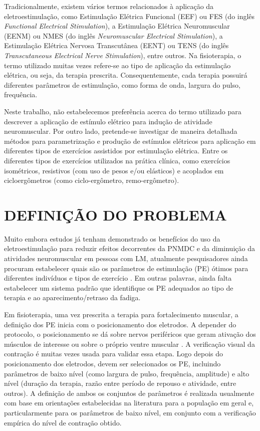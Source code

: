 Tradicionalmente, existem vários termos relacionados à aplicação da eletroestimulação, como Estimulação Elétrica Funcional (\acrshort{EEF}) ou \acrshort{FES} (do inglês \textit{Functional Electrical Stimulation}), a Estimulação Elétrica Neuromuscular (\acrshort{EENM}) ou \acrshort{NMES} (do inglês \textit{Neuromuscular Electrical Stimulation}), a Estimulação Elétrica Nervosa Transcutânea (\acrshort{EENT}) ou \acrshort{TENS} (do inglês \textit{Transcutaneous Electrical Nerve Stimulation}), entre outros. Na fisioterapia, o termo utilizado muitas vezes refere-se ao tipo de aplicação da estimulação elétrica, ou seja, da terapia prescrita. Consequentemente, cada terapia possuirá diferentes parâmetros de estimulação, como forma de onda, largura do pulso, frequência.

Neste trabalho, não estabelecemos preferência acerca do termo utilizado para descrever a aplicação de estímulo elétrico para indução de atividade neuromuscular. Por outro lado, pretende-se investigar de maneira detalhada métodos para parametrização e produção de estímulos elétricos para aplicação em diferentes tipos de exercícios assistidos por estimulação elétrica. Entre os diferentes tipos de exercícios utilizados na prática clínica, como exercícios isométricos, resistivos (com uso de pesos e/ou elásticos) e acoplados em cicloergômetros (como ciclo-ergômetro, remo-ergômetro).

\section{DEFINIÇÃO DO PROBLEMA}

Muito embora estudos já tenham demonstrado os benefícios do uso da eletroestimulação para reduzir efeitos decorrentes da \acrshort{PNMDC} e da diminuição da atividades neuromuscular em pessoas com \acrshort{LM}, atualmente pesquisadores ainda procuram estabelecer quais são os parâmetros de estimulação (\acrshort{PE}) ótimos para diferentes indivíduos e tipos de exercício \cite{Silva2016}. Em outras palavras, ainda falta estabelecer um sistema padrão que identifique os \acrshort{PE} adequados ao tipo de terapia e ao aparecimento/retraso da fadiga.

Em fisioterapia, uma vez prescrita a terapia para fortalecimento muscular, a definição dos \acrshort{PE} inicia com o posicionamento dos eletrodos. A depender do protocolo, o posicionamento se dá sobre nervos periféricos que geram ativação dos músculos de interesse ou sobre o próprio ventre muscular \cite{Kitchen2003a}. A verificação visual da contração é muitas vezes usada para validar essa etapa. Logo depois do posicionamento dos eletrodos, devem ser selecionados os PE, incluindo parâmetros de baixo nível (como largura de pulso, frequência, amplitude) e alto nível (duração da terapia, razão entre período de repouso e atividade, entre outros). A definição de ambos os conjuntos de parâmetros é realizada usualmente com base em orientações estabelecidas na literatura para a população em geral e, particularmente para os parâmetros de baixo nível, em conjunto com a verificação empírica do nível de contração obtido. 

